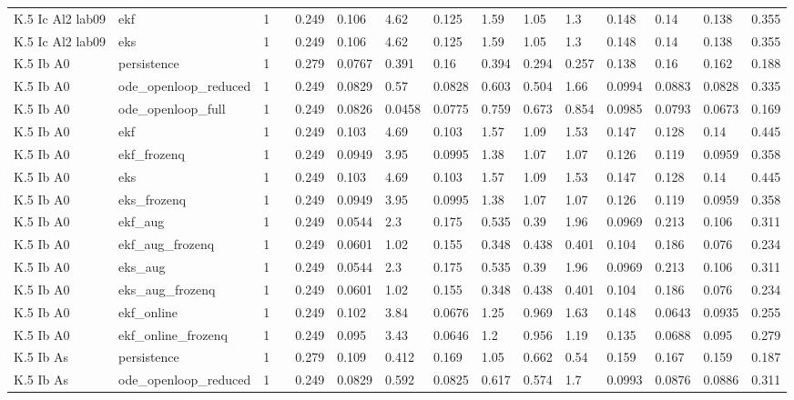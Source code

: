 \begin{table}[t]
\begin{tabular}{lllllllllllllll}
K.5 Ic Al2 lab09 & ekf & 1 &  & 0.249 & 0.106 & 4.62 & 0.125 & 1.59 & 1.05 & 1.3 & 0.148 & 0.14 & 0.138 & 0.355 \\
K.5 Ic Al2 lab09 & eks & 1 &  & 0.249 & 0.106 & 4.62 & 0.125 & 1.59 & 1.05 & 1.3 & 0.148 & 0.14 & 0.138 & 0.355 \\
K.5 Ib A0 & persistence & 1 &  & 0.279 & 0.0767 & 0.391 & 0.16 & 0.394 & 0.294 & 0.257 & 0.138 & 0.16 & 0.162 & 0.188 \\
K.5 Ib A0 & ode\_openloop\_reduced & 1 &  & 0.249 & 0.0829 & 0.57 & 0.0828 & 0.603 & 0.504 & 1.66 & 0.0994 & 0.0883 & 0.0828 & 0.335 \\
K.5 Ib A0 & ode\_openloop\_full & 1 &  & 0.249 & 0.0826 & 0.0458 & 0.0775 & 0.759 & 0.673 & 0.854 & 0.0985 & 0.0793 & 0.0673 & 0.169 \\
K.5 Ib A0 & ekf & 1 &  & 0.249 & 0.103 & 4.69 & 0.103 & 1.57 & 1.09 & 1.53 & 0.147 & 0.128 & 0.14 & 0.445 \\
K.5 Ib A0 & ekf\_frozenq & 1 &  & 0.249 & 0.0949 & 3.95 & 0.0995 & 1.38 & 1.07 & 1.07 & 0.126 & 0.119 & 0.0959 & 0.358 \\
K.5 Ib A0 & eks & 1 &  & 0.249 & 0.103 & 4.69 & 0.103 & 1.57 & 1.09 & 1.53 & 0.147 & 0.128 & 0.14 & 0.445 \\
K.5 Ib A0 & eks\_frozenq & 1 &  & 0.249 & 0.0949 & 3.95 & 0.0995 & 1.38 & 1.07 & 1.07 & 0.126 & 0.119 & 0.0959 & 0.358 \\
K.5 Ib A0 & ekf\_aug & 1 &  & 0.249 & 0.0544 & 2.3 & 0.175 & 0.535 & 0.39 & 1.96 & 0.0969 & 0.213 & 0.106 & 0.311 \\
K.5 Ib A0 & ekf\_aug\_frozenq & 1 &  & 0.249 & 0.0601 & 1.02 & 0.155 & 0.348 & 0.438 & 0.401 & 0.104 & 0.186 & 0.076 & 0.234 \\
K.5 Ib A0 & eks\_aug & 1 &  & 0.249 & 0.0544 & 2.3 & 0.175 & 0.535 & 0.39 & 1.96 & 0.0969 & 0.213 & 0.106 & 0.311 \\
K.5 Ib A0 & eks\_aug\_frozenq & 1 &  & 0.249 & 0.0601 & 1.02 & 0.155 & 0.348 & 0.438 & 0.401 & 0.104 & 0.186 & 0.076 & 0.234 \\
K.5 Ib A0 & ekf\_online & 1 &  & 0.249 & 0.102 & 3.84 & 0.0676 & 1.25 & 0.969 & 1.63 & 0.148 & 0.0643 & 0.0935 & 0.255 \\
K.5 Ib A0 & ekf\_online\_frozenq & 1 &  & 0.249 & 0.095 & 3.43 & 0.0646 & 1.2 & 0.956 & 1.19 & 0.135 & 0.0688 & 0.095 & 0.279 \\
K.5 Ib As & persistence & 1 &  & 0.279 & 0.109 & 0.412 & 0.169 & 1.05 & 0.662 & 0.54 & 0.159 & 0.167 & 0.159 & 0.187 \\
K.5 Ib As & ode\_openloop\_reduced & 1 &  & 0.249 & 0.0829 & 0.592 & 0.0825 & 0.617 & 0.574 & 1.7 & 0.0993 & 0.0876 & 0.0886 & 0.311 \\

\end{tabular}
\end{table}
